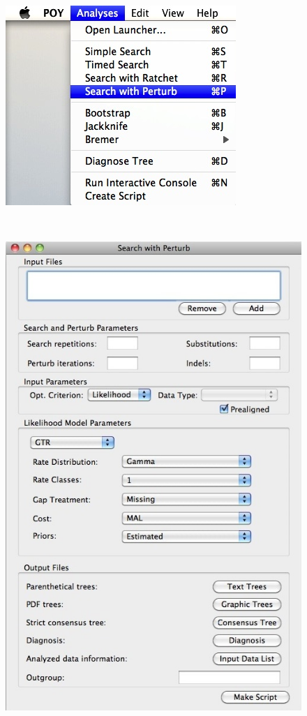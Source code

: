 {\begin{figure}
\centering
\begin{minipage}[c]{0.45\textwidth}
\includegraphics[width=\textwidth]{doc/figures/searchwithperturb_menu.jpg}
\end{minipage}
\,
\begin{minipage}[c]{0.52\textwidth}
\includegraphics[width=\textwidth]{doc/figures/searchwithperturb_window.jpg}

\end{minipage}
\end{figure}}

